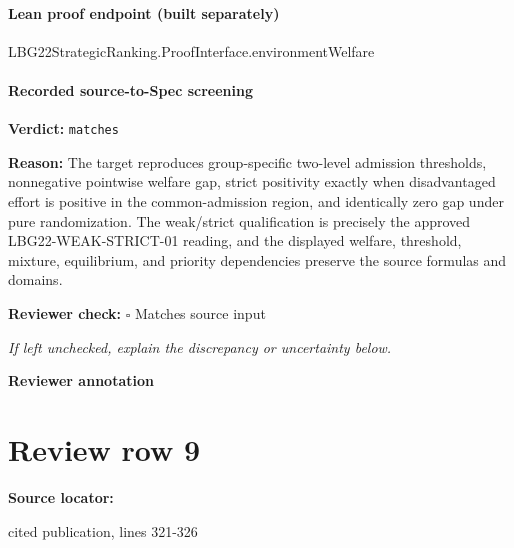\documentclass[10pt]{article}
\newcommand{\reviewerbox}{%
  \par\noindent\fbox{\parbox{0.96\linewidth}{\rule{0pt}{0.38in}}}\par
}
\newcommand{\reviewmatch}[1]{%
  \par\noindent\textbf{Reviewer check:} $\square$\; #1\par
  \noindent\emph{If left unchecked, explain the discrepancy or uncertainty below.}\par
}
\begin{document}
\paragraph{Lean proof endpoint (built separately)}\begin{ReviewVerbatim}
LBG22StrategicRanking.ProofInterface.environmentWelfare
\end{ReviewVerbatim}

\paragraph{Recorded source-to-Spec screening}
\textbf{Verdict:} \texttt{matches}
\\
{\raggedright
\textbf{Reason:} The target reproduces group-\allowbreak{}specific two-\allowbreak{}level admission thresholds, nonnegative pointwise welfare gap, strict positivity exactly when disadvantaged effort is positive in the common-\allowbreak{}admission region, and identically zero gap under pure randomization.\allowbreak{} The weak/\allowbreak{}strict qualification is precisely the approved LBG22-\allowbreak{}WEAK-\allowbreak{}STRICT-\allowbreak{}01 reading, and the displayed welfare, threshold, mixture, equilibrium, and priority dependencies preserve the source formulas and domains.\allowbreak{}
\par}
\reviewmatch{Matches source input}
\noindent\textbf{Reviewer annotation}\par
\reviewerbox
\clearpage
\hypertarget{source-claim-7af287b5fa9fa319}{}
\section*{Review row 9}
\textbf{Source locator:} {\footnotesize\raggedright cited publication, lines 321-\allowbreak{}326\par}
\end{document}
